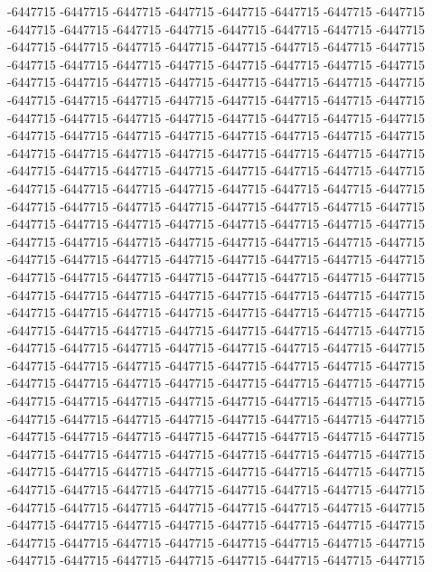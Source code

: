 -6447715 -6447715 -6447715 -6447715 -6447715 -6447715 -6447715 -6447715 -6447715 -6447715 -6447715 -6447715 -6447715 -6447715 -6447715 -6447715 -6447715 -6447715 -6447715 -6447715 -6447715 -6447715 -6447715 -6447715 -6447715 -6447715 -6447715 -6447715 -6447715 -6447715 -6447715 -6447715 -6447715 -6447715 -6447715 -6447715 -6447715 -6447715 -6447715 -6447715 -6447715 -6447715 -6447715 -6447715 -6447715 -6447715 -6447715 -6447715 -6447715 -6447715 -6447715 -6447715 -6447715 -6447715 -6447715 -6447715 -6447715 -6447715 -6447715 -6447715 -6447715 -6447715 -6447715 -6447715 -6447715 -6447715 -6447715 -6447715 -6447715 -6447715 -6447715 -6447715 -6447715 -6447715 -6447715 -6447715 -6447715 -6447715 -6447715 -6447715 -6447715 -6447715 -6447715 -6447715 -6447715 -6447715 -6447715 -6447715 -6447715 -6447715 -6447715 -6447715 -6447715 -6447715 -6447715 -6447715 -6447715 -6447715 -6447715 -6447715 -6447715 -6447715 -6447715 -6447715 -6447715 -6447715 -6447715 -6447715 -6447715 -6447715 -6447715 -6447715 -6447715 -6447715 -6447715 -6447715 -6447715 -6447715 -6447715 -6447715 -6447715 -6447715 -6447715 -6447715 -6447715 -6447715 -6447715 -6447715
-6447715 -6447715 -6447715 -6447715 -6447715 -6447715 -6447715 -6447715 -6447715 -6447715 -6447715 -6447715 -6447715 -6447715 -6447715 -6447715 -6447715 -6447715 -6447715 -6447715 -6447715 -6447715 -6447715 -6447715 -6447715 -6447715 -6447715 -6447715 -6447715 -6447715 -6447715 -6447715 -6447715 -6447715 -6447715 -6447715 -6447715 -6447715 -6447715 -6447715 -6447715 -6447715 -6447715 -6447715 -6447715 -6447715 -6447715 -6447715 -6447715 -6447715 -6447715 -6447715 -6447715 -6447715 -6447715 -6447715 -6447715 -6447715 -6447715 -6447715 -6447715 -6447715 -6447715 -6447715 -6447715 -6447715 -6447715 -6447715 -6447715 -6447715 -6447715 -6447715 -6447715 -6447715 -6447715 -6447715 -6447715 -6447715 -6447715 -6447715 -6447715 -6447715 -6447715 -6447715 -6447715 -6447715 -6447715 -6447715 -6447715 -6447715 -6447715 -6447715 -6447715 -6447715 -6447715 -6447715 -6447715 -6447715 -6447715 -6447715 -6447715 -6447715 -6447715 -6447715 -6447715 -6447715 -6447715 -6447715 -6447715 -6447715 -6447715 -6447715 -6447715 -6447715 -6447715 -6447715 -6447715 -6447715 -6447715 -6447715 -6447715 -6447715 -6447715 -6447715 -6447715 -6447715 -6447715 -6447715
